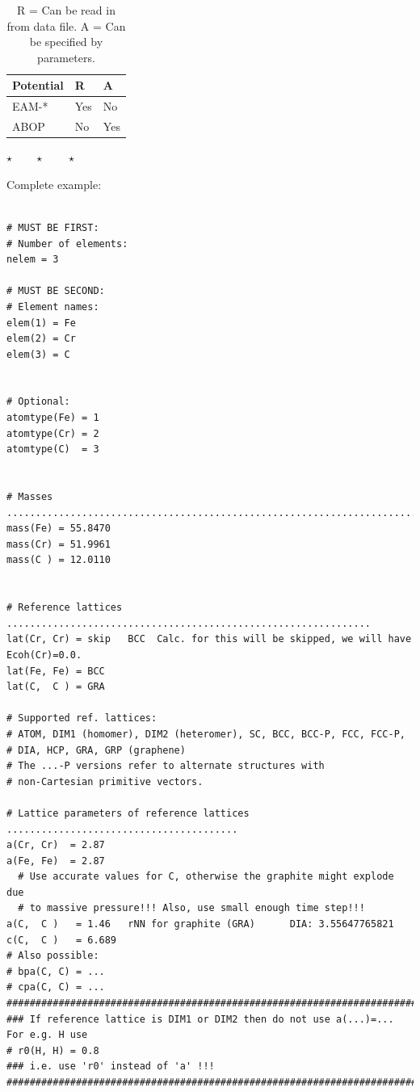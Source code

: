 \documentclass[a4paper,12pt,pdftex,onecolumn]{article}
\newcommand{\stars}{\begin{center}%
\vspace{1em plus 0.5em minus 0.5em}%
$\star \qquad \star \qquad \star$%
\vspace{1em plus 0.5em minus 0.5em}%
\end{center}}
\begin{document}
\begin{table}[!h]
\caption{
R = Can be read in from data file.
A = Can be specified by parameters.
\label{tab:pot-da}
}
\begin{center}
\begin{tabular}{|l|l|l|}
\hline
\hline
Potential   & R    & A  \\
\hline
EAM-*       & Yes  & No \\
ABOP        & No   & Yes \\
\hline
\hline
\end{tabular}
\end{center}
\end{table}

\stars


Complete example:


\begin{Verbatim}[fontsize=\relsize{-1},frame=single]

# MUST BE FIRST:
# Number of elements:
nelem = 3

# MUST BE SECOND:
# Element names:
elem(1) = Fe
elem(2) = Cr
elem(3) = C


# Optional:
atomtype(Fe) = 1
atomtype(Cr) = 2
atomtype(C)  = 3


# Masses ...........................................................................
mass(Fe) = 55.8470
mass(Cr) = 51.9961
mass(C ) = 12.0110


# Reference lattices ...............................................................
lat(Cr, Cr) = skip   BCC  Calc. for this will be skipped, we will have Ecoh(Cr)=0.0.
lat(Fe, Fe) = BCC
lat(C,  C ) = GRA

# Supported ref. lattices:
# ATOM, DIM1 (homomer), DIM2 (heteromer), SC, BCC, BCC-P, FCC, FCC-P,
# DIA, HCP, GRA, GRP (graphene)
# The ...-P versions refer to alternate structures with
# non-Cartesian primitive vectors.

# Lattice parameters of reference lattices ........................................
a(Cr, Cr)  = 2.87
a(Fe, Fe)  = 2.87
  # Use accurate values for C, otherwise the graphite might explode due
  # to massive pressure!!! Also, use small enough time step!!!
a(C,  C )   = 1.46   rNN for graphite (GRA)      DIA: 3.55647765821
c(C,  C )   = 6.689
# Also possible:
# bpa(C, C) = ...
# cpa(C, C) = ...
##################################################################################
### If reference lattice is DIM1 or DIM2 then do not use a(...)=... For e.g. H use
# r0(H, H) = 0.8
### i.e. use 'r0' instead of 'a' !!!
##################################################################################



\end{Verbatim}
\end{document}
